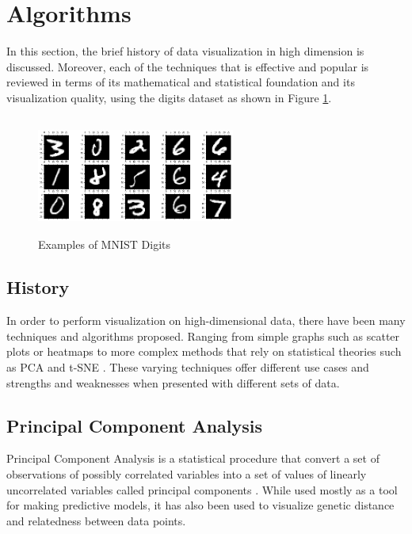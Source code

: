 \documentclass[twocolumn]{article}
\begin{document}
\section{Algorithms}

In this section, the brief history of data visualization in high dimension is discussed. Moreover,
each of the techniques that is effective and popular is reviewed in terms of its mathematical and
statistical foundation and its visualization quality, using the digits dataset as shown in Figure
\ref{fig:digits}.

\begin{figure}[hbt]
  \centering
  \includegraphics[width=6.5cm, height=3.9cm]{digits.png}
  \caption{Examples of MNIST Digits}
  \label{fig:digits}
\end{figure}

\subsection{History}

In order to perform visualization on high-dimensional data, there have been many techniques and
algorithms proposed. Ranging from simple graphs such as scatter plots or heatmaps
\cite{multidimensional_visualization_2} to more complex methods that rely on statistical theories
such as PCA \cite{pca} and t-SNE \cite {tsne}. These varying techniques offer different use cases
and strengths and weaknesses when presented with different sets of data.

\subsection{Principal Component Analysis}

Principal Component Analysis is a statistical procedure that convert a set of observations of
possibly correlated variables into a set of values of linearly uncorrelated variables called
principal components \cite{pca}. While used mostly as a tool for making predictive models, it has
also been used to visualize genetic distance and relatedness between data points.
\end{document}

